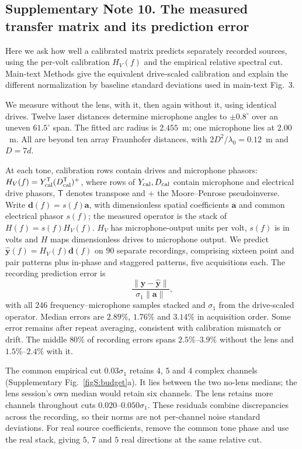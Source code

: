 \documentclass[pdflatex,sn-nature]{sn-jnl}%
\begin{document}
\subsection*{Supplementary Note 10. The measured transfer matrix and its prediction error}

Here we ask how well a calibrated matrix predicts separately recorded sources, using the per-volt calibration $H_V(f)$ and the empirical relative spectral cut. Main-text Methods give the equivalent drive-scaled calibration and explain the different normalization by baseline standard deviations used in main-text Fig.~3.

We measure without the lens, with it, then again without it, using identical drives. Twelve laser distances determine microphone angles
to $\pm0.8^{\circ}$ over an uneven $61.5^{\circ}$ span. The fitted arc radius
is $2.455$~m; one microphone lies at $2.00$~m. All are beyond ten array
Fraunhofer distances, with $2D^2/\lambda_0=0.12$~m and $D=7d$.

At each tone, calibration rows contain drives and microphone phasors:
$H_V(f)=Y_{\rm cal}^{\mathsf T}(D_{\rm cal}^{\mathsf T})^+$,
where rows of $Y_{\rm cal},D_{\rm cal}$ contain microphone and electrical
drive phasors, $\mathsf T$ denotes transpose and $+$ the Moore--Penrose pseudoinverse.
Write $\bm d(f)=s(f)\bm a$, with dimensionless spatial coefficients $\bm a$
and common electrical phasor $s(f)$; the measured operator is the stack
of $H(f)=s(f)H_V(f)$. $H_V$ has microphone-output units per volt, $s(f)$ is
in volts and $H$ maps dimensionless drives to microphone output.
We predict $\hat{\bm y}(f)=H_V(f)\bm d(f)$ on $90$ separate
recordings, comprising sixteen point and pair patterns plus in-phase
and staggered patterns, five acquisitions each.
The recording prediction error is
\[
 \frac{\|\bm y-\hat{\bm y}\|}{\sigma_1\|\bm a\|},
\]
with all $246$ frequency--microphone samples stacked and $\sigma_1$ from
the drive-scaled operator. Median errors are $2.89\%$, $1.76\%$ and
$3.14\%$ in acquisition order. Some error remains after repeat averaging, consistent with calibration mismatch or drift.
The middle $80\%$ of recording errors spans $2.5\%$--$3.9\%$ without
the lens and $1.5\%$--$2.4\%$ with it.

The common empirical cut $0.03\sigma_1$ retains $4$, $5$ and $4$ complex
channels (Supplementary Fig.~\ref{figS:budget}a). It lies between the two
no-lens medians; the lens session's own median would retain six channels.
The lens retains more channels throughout cuts $0.020$--$0.050\sigma_1$.
These residuals combine discrepancies across the recording, so their norms are not per-channel noise standard deviations.
For real source coefficients, remove the common tone phase and use
the real stack, giving $5$, $7$ and $5$ real directions at the same relative cut.
\end{document}
